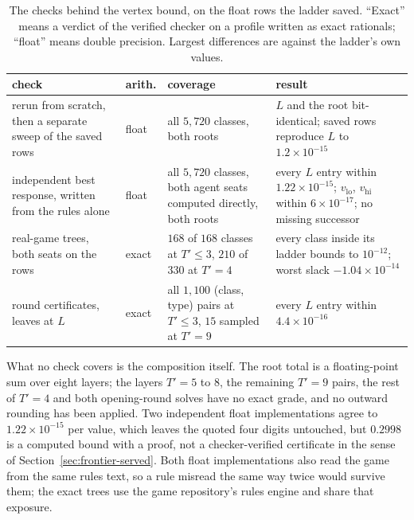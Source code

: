 \documentclass[11pt]{article}
\theoremstyle{plain}
\theoremstyle{definition}
\theoremstyle{remark}
\begin{document}
\begin{table}[t]
\centering
\caption{The checks behind the vertex bound, on the float rows the
ladder saved. ``Exact'' means a verdict of the verified checker on a
profile written as exact rationals; ``float'' means double precision.
Largest differences are against the ladder's own values.}
\label{tab:vertexchecks}
\small
\begin{tabular}{@{}>{\raggedright\arraybackslash}p{3.1cm}>{\raggedright\arraybackslash}p{1.0cm}>{\raggedright\arraybackslash}p{4.3cm}>{\raggedright\arraybackslash}p{4.2cm}@{}}
\toprule
check & arith. & coverage & result\\
\midrule
rerun from scratch, then a separate sweep of the saved rows & float &
all $5{,}720$ classes, both roots & $L$ and the root bit-identical;
saved rows reproduce $L$ to $1.2\times10^{-15}$\\
independent best response, written from the rules alone & float & all
$5{,}720$ classes, both agent seats computed directly, both roots &
every $L$ entry within $1.22\times10^{-15}$; $v_{\mathrm{lo}}$,
$v_{\mathrm{hi}}$ within $6\times10^{-17}$; no missing successor\\
real-game trees, both seats on the rows & exact & $168$ of $168$
classes at $T'\le3$, $210$ of $330$ at $T'=4$ & every class inside its
ladder bounds to $10^{-12}$; worst slack $-1.04\times10^{-14}$\\
round certificates, leaves at $L$ & exact & all $1{,}100$ (class,
type) pairs at $T'\le3$, $15$ sampled at $T'=9$ & every $L$ entry
within $4.4\times10^{-16}$\\
\bottomrule
\end{tabular}
\end{table}

What no check covers is the composition itself. The root total is a
floating-point sum over eight layers; the layers $T'=5$ to $8$, the
remaining $T'=9$ pairs, the rest of $T'=4$ and both opening-round
solves have no exact grade, and no outward rounding has been applied.
Two independent float implementations agree to $1.22\times10^{-15}$
per value, which leaves the quoted four digits untouched, but $0.2998$
is a computed bound with a proof, not a checker-verified certificate
in the sense of Section~\ref{sec:frontier-served}. Both float
implementations also read the game from the same rules text, so a rule
misread the same way twice would survive them; the exact trees use
the game repository's rules engine and share that exposure.
\end{document}
